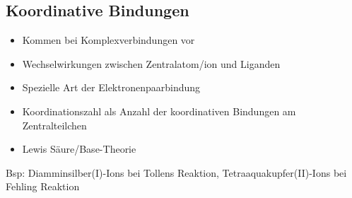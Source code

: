 \subsection{Koordinative Bindungen}
\begin{itemize}
    \item Kommen bei Komplexverbindungen vor
    \item Wechselwirkungen zwischen Zentralatom/ion und Liganden
    \item Spezielle Art der Elektronenpaarbindung
    \item Koordinationszahl als Anzahl der koordinativen Bindungen am Zentralteilchen
    \item Lewis Säure/Base-Theorie
\end{itemize}
Bsp: Diamminsilber(I)-Ions bei Tollens Reaktion, Tetraaquakupfer(II)-Ions bei Fehling Reaktion
